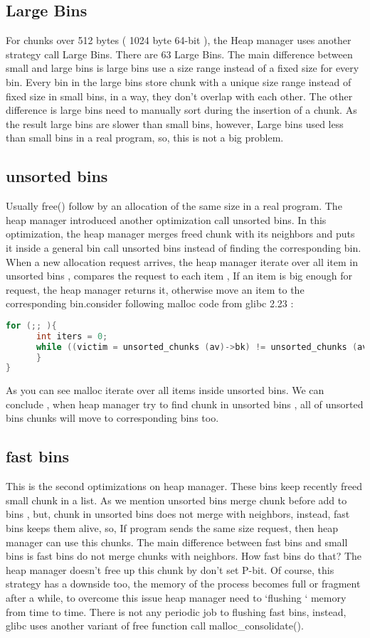 \documentclass{masterthesis}
\newcommand*\libc{glibc}
\newcommand*\fb{fast bins}
\newcommand*\ub{unsorted bins}
\begin{document}
\subsection{Large Bins}
For chunks over 512 bytes ( 1024 byte 64-bit ), the Heap manager uses another strategy call Large Bins. There are 63 Large Bins. The main difference between small and large bins is large bins use a size range instead of a fixed size for every bin. Every bin in the large bins store chunk with a unique size range instead of fixed size in small bins, in a way, they don’t overlap with each other.
The other difference is large bins need to manually sort during the insertion of a chunk. As the result large bins are slower than small bins, however, Large bins used less than small bins in a real program, so, this is not a big problem.

\subsection{\ub{}}
Usually free() follow by an allocation of the same size in a real program. The heap manager introduced another optimization call \ub{}. In this optimization, the heap manager merges freed chunk with its neighbors and puts it inside a general bin call \ub{} instead of finding the corresponding bin. When a new allocation request arrives, the heap manager iterate over all item in \ub{} , compares the request to each item , If an item is big enough for request, the heap manager returns it, otherwise move an item to the corresponding bin.consider following malloc code from \libc{} 2.23 :
\begin{lstlisting}[language=c]
for (;; ){
      int iters = 0;
      while ((victim = unsorted_chunks (av)->bk) != unsorted_chunks (av)){
      }
}
\end{lstlisting}
As you can see malloc iterate over all items inside \ub{}. We can conclude , when heap manager try to find chunk in unsorted bins , all of unsorted bins chunks will move to corresponding bins too.

\subsection{\fb{}}
This is the second optimizations on heap manager. These bins keep recently freed small chunk in a list. As we mention \ub{} merge chunk before add to bins , but, chunk in \ub{} does not merge with neighbors, instead, \fb{} keeps them alive, so, If program sends the same size request, then heap manager can use this chunks.
The main difference between \fb{} and small bins is \fb{} do not merge chunks with neighbors. How \fb{} do that? The heap manager doesn’t free up this chunk by don’t set P-bit. Of course, this strategy has a downside too, the memory of the process becomes full or fragment after a while, to overcome this issue heap manager need to ‘flushing ‘ memory from time to time. There is not any periodic job to flushing \fb{}, instead, \libc{} uses another variant of free function call malloc\_consolidate(). 
\end{document}
